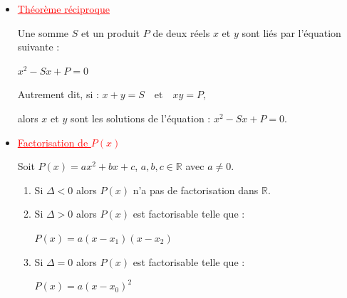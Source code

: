 \documentclass[12pt,a4paper]{article}
\newcounter{solution}
\begin{document}
\begin{itemize}
\item \textcolor{red}{\underline{Théorème réciproque}}

Une somme $S$ et un produit $P$ de deux réels $x$ et $y$ sont liés par l’équation suivante :

\( \boxed{x^2 - Sx + P = 0} \)

Autrement dit, si : \( x + y = S
\quad \text{et} \quad
xy = P, \)

alors $x$ et $y$ sont les solutions de l’équation : \( x^2 - Sx + P = 0. \)

\item \textcolor{red}{\underline{Factorisation de $P(x)$}}

\medskip

Soit $P(x)=ax^2+bx+c$, $a,b,c\in\mathbb{R}$ avec $a\neq0$.

\begin{enumerate}
\item[(i)] Si $\Delta<0$ alors $P(x)$ n’a pas de factorisation dans $\mathbb{R}$.

\item[(ii)] Si $\Delta>0$ alors $P(x)$ est factorisable telle que :

\(
\boxed{P(x)=a(x-x_1)(x-x_2)}
\)

\item[(iii)] Si $\Delta=0$ alors $P(x)$ est factorisable telle que :

\(
\boxed{P(x)=a(x-x_0)^2}
\)
\end{enumerate}

\end{itemize}
\end{document}

